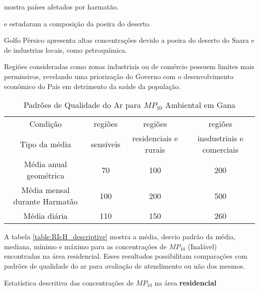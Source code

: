 \cite{prospero2002} mostra países afetados por harmatão. 

\cite{engelbrecht2009a} e \citep{engelbrecht2009b} estudaram a composição 
da poeira do deserto.

\citep{kaku2016} Golfo Pérsico apresenta altas concentrações devido a poeira do 
deserto do Saara e de industrias locais, como petroquímica. 

Regiões consideradas como zonas
industriais ou de comércio possuem limites mais permissivos, revelando 
uma priorização do Governo com o desenvolvimento econômico do País em 
detrimento da saúde da população.

\begin{table}[H]
\centering
\begin{tabular}{cccc}
\hline
Condição                      &   regiões  &        regiões       &         regiões               \\
Tipo da média                 & sensíveis & residenciais e rurais & insdustriais e comerciais      \\
\hline
Média anual geométrica        & 70              & 100                      & 200                   \\
Média mensal durante Harmatão & 100             & 200                      & 500                     \\
Média diária                  & 110             & 150                      & 260         \\               
\hline
\end{tabular}
\caption{Padrões de Qualidade do Ar para $MP_{10}$ Ambiental em Gana
         \cite{epa2015} \label{table:padroesgana}}
\end{table}

A tabela \ref{table:RIcH_descriptive} mostra a média, desvio padrão da média,
mediana, mínimo e máximo para as concentrações de $MP_{10}$ (Inalável) 
encontradas na área residencial. Esses resultados possibilitam comparações com 
padrões de qualidade do ar para avaliação de atendimento ou não dos mesmos.    

\begin{table}[H]
  \centering
    
  \caption{Estatística descritiva das concentrações de  $MP_{10}$ na área 
           \textbf{residencial} \label{table:RIcH_descriptive}}
\end{table}

